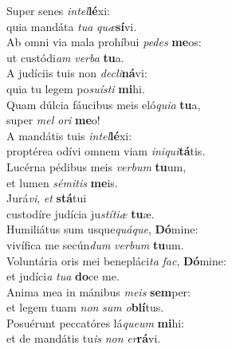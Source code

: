 \evenverse Super senes \textit{in}\textit{tel}\textbf{lé}xi:~\*\\
\evenverse quia mandáta \textit{tu}\textit{a} \textit{quæ}\textbf{sí}vi.\\
\oddverse Ab omni via mala prohíbui \textit{pe}\textit{des} \textbf{me}os:~\*\\
\oddverse ut custódi\textit{am} \textit{ver}\textit{ba} \textbf{tu}a.\\
\evenverse A judíciis tuis non \textit{de}\textit{cli}\textbf{ná}vi:~\*\\
\evenverse quia tu legem po\textit{su}\textit{í}\textit{sti} \textbf{mi}hi.\\
\oddverse Quam dúlcia fáucibus meis eló\textit{qui}\textit{a} \textbf{tu}a,~\*\\
\oddverse super \textit{mel} \textit{o}\textit{ri} \textbf{me}o!\\
\evenverse A mandátis tuis \textit{in}\textit{tel}\textbf{lé}xi:~\*\\
\evenverse proptérea odívi omnem viam \textit{i}\textit{ni}\textit{qui}\textbf{tá}tis.\\
\oddverse Lucérna pédibus meis \textit{ver}\textit{bum} \textbf{tu}um,~\*\\
\oddverse et lumen \textit{sé}\textit{mi}\textit{tis} \textbf{me}is.\\
\evenverse Jurá\textit{vi}, \textit{et} \textbf{stá}tui~\*\\
\evenverse custodíre judícia ju\textit{stí}\textit{ti}\textit{æ} \textbf{tu}æ.\\
\oddverse Humiliátus sum usque\textit{quá}\textit{que}, \textbf{Dó}mine:~\*\\
\oddverse vivífica me secún\textit{dum} \textit{ver}\textit{bum} \textbf{tu}um.\\
\evenverse Voluntária oris mei benepláci\textit{ta} \textit{fac}, \textbf{Dó}mine:~\*\\
\evenverse et judíci\textit{a} \textit{tu}\textit{a} \textbf{do}ce me.\\
\oddverse Anima mea in mánibus \textit{me}\textit{is} \textbf{sem}per:~\*\\
\oddverse et legem tuam \textit{non} \textit{sum} \textit{o}\textbf{blí}tus.\\
\evenverse Posuérunt peccatóres lá\textit{que}\textit{um} \textbf{mi}hi:~\*\\
\evenverse et de mandátis tu\textit{is} \textit{non} \textit{er}\textbf{rá}vi.\\
